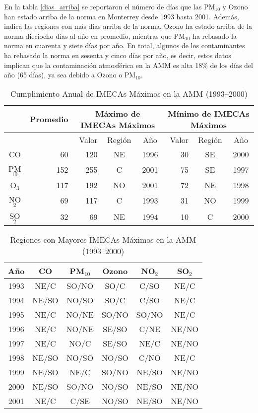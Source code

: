 En la tabla \ref{dias_arriba} se reportaron el número de días que las PM$_{10}$ y Ozono han estado arriba de la norma en Monterrey desde 1993 hasta 2001. Además, indica las regiones con más días arriba de la norma, Ozono ha estado arriba de la norma dieciocho días al año en promedio, mientras que PM$_{10}$ ha rebasado la norma en cuarenta y siete días por año. En total, algunos de los contaminantes ha rebasado la norma en sesenta y cinco días por año, es decir, estos datos implican que la contaminación atmosférica en la AMM es alta 18\% de los días del año (65 días), ya sea debido a Ozono o PM$_{10}$.

\begin{table}[H]
    \centering
    \caption{Cumplimiento Anual de IMECAs Máximos en la AMM (1993--2000)}
    \begin{tabular}{|c|r|r|c|c|r|c|c|}
        \hline
	 &Promedio &\multicolumn{3}{|c|}{Máximo de IMECAs Máximos} &\multicolumn{3}{|c|}{Mínimo de IMECAs Máximos} \\ \hline
	 & &Valor &Región &Año &Valor &Región &Año \\ \hline
	CO &60 &120 &NE &1996 &30 &SE &2000 \\ 
	PM$_{10}$ &152 &255 &C &2001 &75 &SE &1997 \\ 
	O$_{3}$ &117 &192 &NO &2001 &72 &NE &1998 \\ 
	NO$_{2}$ &69 &117 &C &1993 &31 &NO &1999 \\ 
	SO$_{2}$ &32 &69 &NE &1994 &10 &C &2000 \\ \hline
        \end{tabular}
    \label{max_min}
\end{table}

\begin{table}[H]
    \centering
    \caption{Regiones con Mayores IMECAs Máximos en la AMM (1993--2000)}
    \begin{tabular}{|c|c|c|c|c|c|}
        \hline
	 Año &CO &PM$_{10}$ &Ozono &NO$_{2}$ &SO$_{2}$ \\ \hline
	 1993 &NE/C &SO/NO &SO/C &C/SO &NE/C \\
	 1994 &NE/SO &NO/SO &SO/C &C/SO &NE/C \\
	 1995 &NE/C &NO/NE &SO/NO &SO/NO &NE/C \\
	 1996 &NE/C &NO/NE &SE/SO &C/NE &NE/NO \\
	 1997 &NE/C &NO/C &SE/SO &NE/C &NE/NO \\
	 1998 &NE/SO &NO/SO &NO/SO &C/NO &NE/C \\
	 1999 &NE/SO &NE/C &SO/NO &NE/SO &NE/NO \\
	 2000 &NE/SO &SO/NO &NO/SO &NE/SO &NE/NO \\
	 2001 &NE/C &C/SE &NO/SO &NE/SO &NE/NO \\ \hline
        \end{tabular}
    \label{mayores_max}
\end{table}

